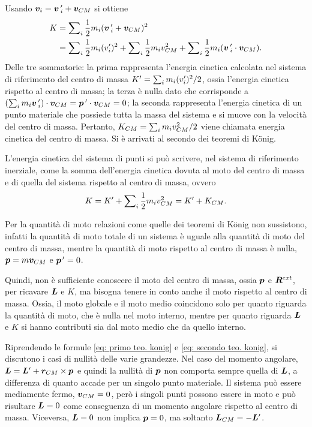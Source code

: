 Usando $\bm{v}_i=\bm{v}\,'_i+\bm{v}_{CM}$ si ottiene
\begin{equation}
    \begin{split}
         K&=\sum\nolimits_i\frac{1}{2}m_i(\bm{v}\,'_i+\bm{v}_{CM})^2 \\
         &=\sum\nolimits_i\frac{1}{2}m_i(v'_i)^2+\sum\nolimits_i\frac{1}{2}m_iv_{CM}^2+\sum\nolimits_i\frac{1}{2}m_i(\bm{v}\,'_i\cdot\bm{v}_{CM}).
    \end{split}
\end{equation}
Delle tre sommatorie: la prima rappresenta l'energia cinetica calcolata nel sistema di riferimento del centro di massa $K'=\sum\nolimits_im_i(v'_i)^2/2$, ossia l'energia cinetica rispetto al centro di massa; la terza è nulla dato che corrisponde a $(\sum\nolimits_im_i\bm{v}\,'_i)\cdot\bm{v}_{CM}=\bm{p}\,'\cdot\bm{v}_{CM}=0$; la seconda rappresenta l'energia cinetica di un punto materiale che possiede tutta la massa del sistema e si muove con la velocità del centro di massa. Pertanto, $K_{CM}=\sum\nolimits_im_iv_{CM}^2/2$ viene chiamata energia cinetica del centro di massa. Si è arrivati al secondo dei teoremi di K\"onig.
\begin{teo}
    L'energia cinetica del sistema di punti si può scrivere, nel sistema di riferimento inerziale, come la somma dell'energia cinetica dovuta al moto del centro di massa e di quella del sistema rispetto al centro di massa, ovvero
    \begin{equation}
    \label{eq: secondo teo. konig}
        K=K'+\sum\nolimits_i\frac{1}{2}m_iv_{CM}^2=K'+K_{CM}.
    \end{equation}
\end{teo}
\begin{obs}
    Per la quantità di moto relazioni come quelle dei teoremi di K\"onig non sussistono, infatti la quantità di moto totale di un sistema è uguale alla quantità di moto del centro di massa, mentre la quantità di moto rispetto al centro di massa è nulla, $\bm{p}=m\bm{v}_{CM}$ e $\bm{p}^{\,\prime}=0$. 
\end{obs}
Quindi, non è sufficiente conoscere il moto del centro di massa, ossia $\bm{p}$ e $\bm{R}^{ext}$, per ricavare $\bm{L}$ e $K$, ma bisogna tenere in conto anche il moto rispetto al centro di massa. Ossia, il moto globale e il moto medio coincidono solo per quanto riguarda la quantità di moto, che è nulla nel moto interno, mentre per quanto riguarda $\bm{L}$ e $K$ si hanno contributi sia dal moto medio che da quello interno. 

Riprendendo le formule \eqref{eq: primo teo. konig} e \eqref{eq: secondo teo. konig}, si discutono i casi di nullità delle varie grandezze. Nel caso del momento angolare, $\bm{L}=\bm{L}'+\bm{r}_{CM}\times \bm{p}$ e quindi la nullità di $\bm{p}$ non comporta sempre quella di $\bm{L}$, a differenza di quanto accade per un singolo punto materiale. Il sistema può essere mediamente fermo, $\bm{v}_{CM}=0$, però i singoli punti possono essere in moto e può risultare $\bm{L}=0$ come conseguenza di un momento angolare rispetto al centro di massa. Viceversa, $\bm{L}=0$ non implica $\bm{p}=0$, ma soltanto $\bm{L}_{CM}=-\bm{L}'$.

